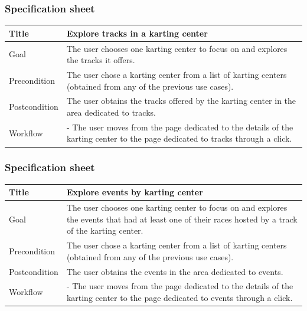 \documentclass{beamer}
\begin{document}
\begin{frame}
    \frametitle{Specification sheet}
    \begin{table}
        \tiny
        \begin{tabular}{|p{2cm}|p{6cm}|}
        \hline
        Title & \textbf{Explore tracks in a karting center} \\
        \hline
        Goal & The user chooses one karting center to focus on and explores the tracks it offers. \\
        \hline
        Precondition & The user chose a karting center from a list of karting centers (obtained from any of the previous use cases).\\
        \hline
        Postcondition & The user obtains the tracks offered by the karting center in the area dedicated to tracks. \\
        \hline
        Workflow &
        - The user moves from the page dedicated to the details of the karting center to the
        page dedicated to tracks through a click. \\
        \hline
        \end{tabular}
\end{table}
\end{frame}

\begin{frame}
    \frametitle{Specification sheet}
    \begin{table}
        \tiny
        \begin{tabular}{|p{2cm}|p{6cm}|}
        \hline
        Title & \textbf{Explore events by karting center} \\
        \hline
        Goal & The user chooses one karting center to focus on and explores the events that had at least one 
        of their races hosted by a track of the karting center. \\
        \hline
        Precondition & The user chose a karting center from a list of karting centers (obtained from any of the previous use cases).\\
        \hline
        Postcondition & The user obtains the events in the area dedicated to events. \\
        \hline
        Workflow &
        - The user moves from the page dedicated to the details of the karting center to the
        page dedicated to events through a click. \\
        \hline
        \end{tabular}
\end{table}
\end{frame}
\end{document}
